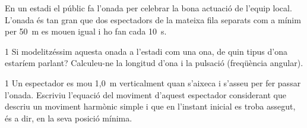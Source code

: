 En un estadi el públic fa l'onada per celebrar la bona actuació de l'equip local. L'onada és tan gran que dos espectadors de la mateixa fila separats com a mínim per 50~m es mouen igual i ho fan cada 10~s.


\begin{apartat}{1}
Si modelitzéssim aquesta onada a l'estadi com una ona, de quin tipus d'ona estaríem parlant? Calculeu-ne la longitud d'ona i la pulsació (freqüència angular).
\end{apartat}

\begin{apartat}{1}
Un espectador es mou 1,0~m verticalment quan s'aixeca i s'asseu per fer passar l'onada. Escriviu l'equació del moviment d'aquest espectador considerant que descriu un moviment harmònic simple i que en l'instant inicial es troba assegut, és a dir, en la seva posició mínima.
\end{apartat}
